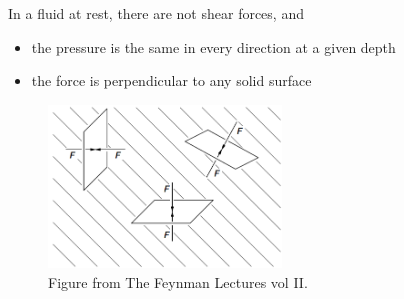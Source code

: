 \documentclass[]{beamer}
\begin{document}



\begin{frame}


In a fluid at rest, there are not shear forces, and
\vspace{5mm}

\pause
\begin{itemize}
  \item the pressure is the same in every direction at a given depth
  \pause
  \item the force is perpendicular to any solid surface
\end{itemize}

\vspace{5mm}
\pause
\begin{center}
  \begin{figure}
    \includegraphics[height=1.7in]{images2/Feiman_1.png}
    \caption[]{Figure from The Feynman Lectures vol II.}
    \label{Feinman_1}
  \end{figure}
\end{center}


  \end{frame}




\end{document}
